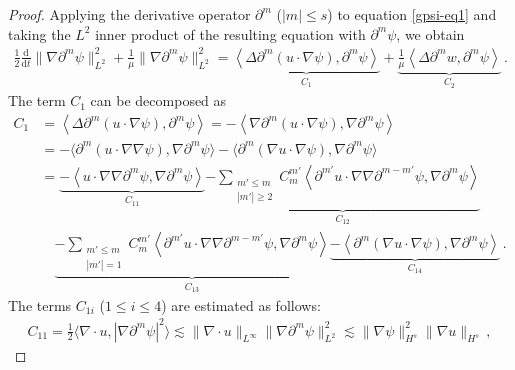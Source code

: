 \documentclass[reqno,11pt]{amsart}
\numberwithin{equation}{section}
\def\p{\partial}
\def\d{\mathrm{d}}
\begin{document}
\begin{proof}

Applying the derivative operator $\partial^m$ ($|m| \le s$) to equation \eqref{gpsi-eq1} and taking the $L^2$ inner product of the resulting equation with $\partial^m \psi$, we obtain
\begin{equation}\label{gpsi-eq4}
\begin{aligned}
\frac{1}{2} \frac{\d}{\d t} \|\nabla \partial^m \psi\|_{L^2}^2 + \frac{1}{\mu} \|\nabla \partial^m \psi\|_{L^2}^2
=  \underset{C_{1}}{\underbrace{\left\langle \Delta \partial^m (u \cdot \nabla \psi), \partial^m \psi \right\rangle}}+\underset{C_{2}}{\underbrace{\frac{1}{\mu} \left\langle \Delta \partial^m w, \partial^m \psi \right\rangle}} \,.
\end{aligned}
\end{equation}
The term $C_1$ can be decomposed as
\begin{equation*}
\begin{aligned}
C_1 & =\left\langle \Delta \partial^m (u \cdot \nabla \psi), \partial^m \psi \right\rangle = -\left\langle \nabla \partial^m (u \cdot \nabla \psi), \nabla\partial^m \psi \right\rangle\\&
=-\langle \p^m(u\cdot\nabla\nabla\psi),\nabla\p^m\psi\rangle-\langle\p^m(\nabla u \cdot\nabla \psi),\nabla\p^m\psi  \rangle\\&
=\underset{C_{11}}{\underbrace{-\left\langle u \cdot \nabla \nabla \partial^m \psi, \nabla \partial^m \psi \right\rangle}}
\underset{C_{12}}{\underbrace{- \sum_{\substack{m' \leq m \\ |m'| \geq 2}} C_m^{m'} \left\langle \partial^{m'} u \cdot \nabla \nabla \partial^{m - m'} \psi, \nabla \partial^m \psi \right\rangle}}\\&
\quad\underset{C_{13}}{\underbrace{- \sum_{\substack{m' \leq m \\ |m'| = 1}} C_m^{m'} \left\langle \partial^{m'} u \cdot \nabla \nabla \partial^{m - m'} \psi, \nabla \partial^m \psi \right\rangle}}
\underset{C_{14}}{\underbrace{- \left\langle \partial^m (\nabla u \cdot \nabla \psi), \nabla \partial^m \psi \right\rangle}}  \,.
\end{aligned}
\end{equation*}
The terms $C_{1i}$ ($1 \le i \le 4$) are estimated as follows:
\begin{equation*}
\begin{aligned}
C_{11} = \frac{1}{2} \langle \nabla \cdot u, | \nabla \p^m \psi |^2  \rangle \lesssim \|\nabla \cdot u \|_{L^\infty} \| \nabla \p^m \psi \|_{L^2}^2 \lesssim \| \nabla \psi \|^2_{H^s} \| \nabla u \|_{H^s} \,,

\end{aligned}
\end{equation*}
\end{proof}
\end{document}
